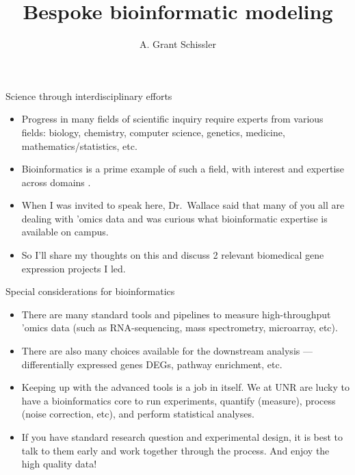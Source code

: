 \documentclass[ignorenonframetext,aspectratio=169,]{beamer}
\title{Bespoke bioinformatic modeling}
\author{A. Grant Schissler}
\institute{Department of Mathematics and Statistics University of Nevada, Reno}
\date{}
\providecommand{\tightlist}{%
  \setlength{\itemsep}{0pt}\setlength{\parskip}{0pt}}
\begin{document}
\frame{\titlepage}

\begin{frame}{%
\protect\hypertarget{science-through-interdisciplinary-efforts}{%
Science through interdisciplinary efforts}}

\begin{itemize}
\tightlist
\item
  Progress in many fields of scientific inquiry require experts from
  various fields: biology, chemistry, computer science, genetics,
  medicine, mathematics/statistics, etc.
\item
  Bioinformatics is a prime example of such a field, with interest and
  expertise across domains .
\item
  When I was invited to speak here, Dr.~Wallace said that many of you
  all are dealing with ’omics data and was curious what bioinformatic
  expertise is available on campus.
\item
  So I’ll share my thoughts on this and discuss 2 relevant biomedical
  gene expression projects I led.
\end{itemize}

\end{frame}

\begin{frame}{%
\protect\hypertarget{special-considerations-for-bioinformatics}{%
Special considerations for bioinformatics}}

\begin{itemize}
\tightlist
\item
  There are many standard tools and pipelines to measure high-throughput
  ’omics data (such as RNA-sequencing, mass spectrometry, microarray,
  etc).
\item
  There are also many choices available for the downstream analysis —
  differentially expressed genes DEGs, pathway enrichment, etc.
\item
  Keeping up with the advanced tools is a job in itself. We at UNR are
  lucky to have a bioinformatics core to run experiments, quantify
  (measure), process (noise correction, etc), and perform statistical
  analyses.
\item
  If you have standard research question and experimental design, it is
  best to talk to them early and work together through the process. And
  enjoy the high quality data!
\end{itemize}

\end{frame}
\end{document}
